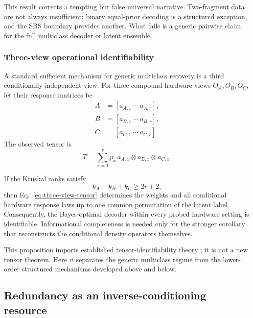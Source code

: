 This result corrects a tempting but false universal narrative.  Two-fragment data are not always insufficient: binary equal-prior decoding is a structured exception, and the SBS boundary provides another.  What fails is a generic pairwise claim for the full multiclass decoder or latent ensemble.

\subsubsection{Three-view operational identifiability}

A standard sufficient mechanism for generic multiclass recovery is a third conditionally independent view.  For three compound hardware views $O_A,O_B,O_C$, let their response matrices be
\begin{equation}
\begin{aligned}
A&=[a_{A,1}\ \cdots\ a_{A,r}],\\
B&=[a_{B,1}\ \cdots\ a_{B,r}],\\
C&=[a_{C,1}\ \cdots\ a_{C,r}].
\end{aligned}
\end{equation}
The observed tensor is
\begin{equation}
T=\sum_{x=1}^{r}p_x\,a_{A,x}\otimes a_{B,x}\otimes a_{C,x}.
\label{eq:three-view-tensor}
\end{equation}

\begin{proposition}
\label{prop:three-view}
If the Kruskal ranks satisfy
\begin{equation}
k_A+k_B+k_C\ge2r+2,
\label{eq:kruskal}
\end{equation}
then Eq.~\eqref{eq:three-view-tensor} determines the weights and all conditional hardware response laws up to one common permutation of the latent label.  Consequently, the Bayes-optimal decoder within every probed hardware setting is identifiable.  Informational completeness is needed only for the stronger corollary that reconstructs the conditional density operators themselves.
\end{proposition}

This proposition imports established tensor-identifiability theory \cite{allman2009,anandkumar2014,bhaskara2014,sidiropoulos2017}; it is not a new tensor theorem.  Here it separates the generic multiclass regime from the lower-order structured mechanisms developed above and below.

\subsection{Redundancy as an inverse-conditioning resource}
\label{sec:redundancy-conditioning}

